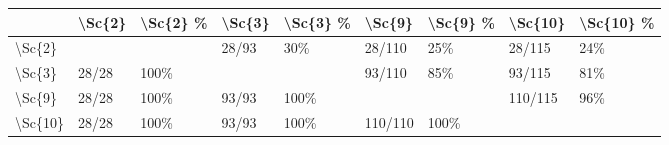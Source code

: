 \begin{tabular}{lllllllll}
\toprule
{} & \textbackslash Sc\{2\} & \textbackslash Sc\{2\} \% & \textbackslash Sc\{3\} & \textbackslash Sc\{3\} \% &   \textbackslash Sc\{9\} & \textbackslash Sc\{9\} \% &  \textbackslash Sc\{10\} & \textbackslash Sc\{10\} \% \\
\midrule
\textbackslash Sc\{2\}  &        &          &  28/93 &      30\% &   28/110 &      25\% &   28/115 &       24\% \\
\textbackslash Sc\{3\}  &  28/28 &     100\% &        &          &   93/110 &      85\% &   93/115 &       81\% \\
\textbackslash Sc\{9\}  &  28/28 &     100\% &  93/93 &     100\% &          &          &  110/115 &       96\% \\
\textbackslash Sc\{10\} &  28/28 &     100\% &  93/93 &     100\% &  110/110 &     100\% &          &           \\
\bottomrule
\end{tabular}
